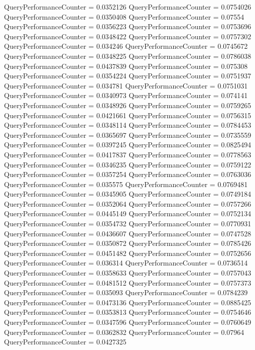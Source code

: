 \documentclass[9pt]{article}
\theoremstyle{plain}
\theoremstyle{definition}
\theoremstyle{remark}
\numberwithin{equation}{section}
\begin{document}
QueryPerformanceCounter  =  0.0352126
QueryPerformanceCounter  =  0.0754026
QueryPerformanceCounter  =  0.0350408
QueryPerformanceCounter  =  0.07554
QueryPerformanceCounter  =  0.0356223
QueryPerformanceCounter  =  0.0753696
QueryPerformanceCounter  =  0.0348422
QueryPerformanceCounter  =  0.0757302
QueryPerformanceCounter  =  0.034246
QueryPerformanceCounter  =  0.0745672
QueryPerformanceCounter  =  0.0348225
QueryPerformanceCounter  =  0.0786038
QueryPerformanceCounter  =  0.0437839
QueryPerformanceCounter  =  0.075308
QueryPerformanceCounter  =  0.0354224
QueryPerformanceCounter  =  0.0751937
QueryPerformanceCounter  =  0.034781
QueryPerformanceCounter  =  0.0751031
QueryPerformanceCounter  =  0.0340973
QueryPerformanceCounter  =  0.074141
QueryPerformanceCounter  =  0.0348926
QueryPerformanceCounter  =  0.0759265
QueryPerformanceCounter  =  0.0421661
QueryPerformanceCounter  =  0.0756315
QueryPerformanceCounter  =  0.0348114
QueryPerformanceCounter  =  0.0784453
QueryPerformanceCounter  =  0.0365697
QueryPerformanceCounter  =  0.0735559
QueryPerformanceCounter  =  0.0397245
QueryPerformanceCounter  =  0.0825494
QueryPerformanceCounter  =  0.0417837
QueryPerformanceCounter  =  0.0778563
QueryPerformanceCounter  =  0.0346235
QueryPerformanceCounter  =  0.0759122
QueryPerformanceCounter  =  0.0357254
QueryPerformanceCounter  =  0.0763036
QueryPerformanceCounter  =  0.035575
QueryPerformanceCounter  =  0.0769481
QueryPerformanceCounter  =  0.0345905
QueryPerformanceCounter  =  0.0749184
QueryPerformanceCounter  =  0.0352064
QueryPerformanceCounter  =  0.0757266
QueryPerformanceCounter  =  0.0445149
QueryPerformanceCounter  =  0.0752134
QueryPerformanceCounter  =  0.0354732
QueryPerformanceCounter  =  0.0770931
QueryPerformanceCounter  =  0.0436607
QueryPerformanceCounter  =  0.0747528
QueryPerformanceCounter  =  0.0350872
QueryPerformanceCounter  =  0.0785426
QueryPerformanceCounter  =  0.0451482
QueryPerformanceCounter  =  0.0752656
QueryPerformanceCounter  =  0.036314
QueryPerformanceCounter  =  0.0736514
QueryPerformanceCounter  =  0.0358633
QueryPerformanceCounter  =  0.0757043
QueryPerformanceCounter  =  0.0481512
QueryPerformanceCounter  =  0.0757373
QueryPerformanceCounter  =  0.035093
QueryPerformanceCounter  =  0.0784239
QueryPerformanceCounter  =  0.0473136
QueryPerformanceCounter  =  0.0885425
QueryPerformanceCounter  =  0.0353813
QueryPerformanceCounter  =  0.0754646
QueryPerformanceCounter  =  0.0347596
QueryPerformanceCounter  =  0.0760649
QueryPerformanceCounter  =  0.0362832
QueryPerformanceCounter  =  0.07964
QueryPerformanceCounter  =  0.0427325
\end{document}
